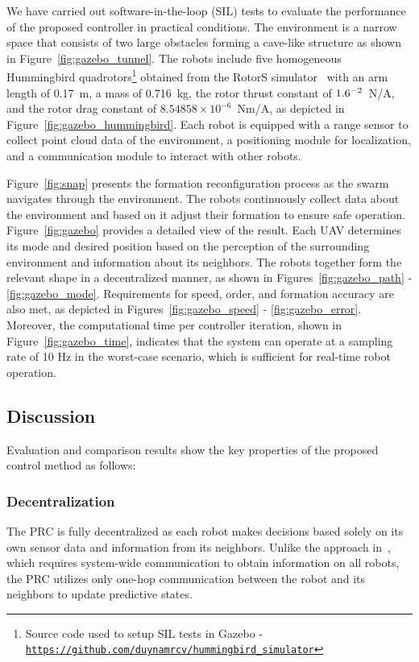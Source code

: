 We have carried out software-in-the-loop (SIL) tests to evaluate the performance of the proposed controller in practical conditions. The environment is a narrow space that consists of two large obstacles forming a cave-like structure as shown in Figure~\ref{fig:gazebo_tunnel}. The robots include five homogeneous Hummingbird quadrotors\footnote{Source code used to setup SIL tests in Gazebo - {\tt\url{https://github.com/duynamrcv/hummingbird_simulator}}} obtained from the RotorS simulator~\cite{Furrer2016} with an arm length of 0.17~m, a mass of 0.716~kg, the rotor thrust constant of $1.6\time10^{-2}$~N/A, and the rotor drag constant of $8.54858\times10^{-6}$~Nm/A, as depicted in Figure~\ref{fig:gazebo_hummingbird}. Each robot is equipped with a range sensor to collect point cloud data of the environment, a positioning module for localization, and a communication module to interact with other robots.

Figure~\ref{fig:snap} presents the formation reconfiguration process as the swarm navigates through the environment. The robots continuously collect data about the environment and based on it adjust their formation to ensure safe operation. Figure~\ref{fig:gazebo} provides a detailed view of the result. Each UAV determines its mode and desired position based on the perception of the surrounding environment and information about its neighbors. The robots together form the relevant shape in a decentralized manner, as shown in Figures~\ref{fig:gazebo_path} - \ref{fig:gazebo_mode}. Requirements for speed, order, and formation accuracy are also met, as depicted in Figures~\ref{fig:gazebo_speed} - \ref{fig:gazebo_error}. Moreover, the computational time per controller iteration, shown in Figure~\ref{fig:gazebo_time}, indicates that the system can operate at a sampling rate of 10 Hz in the worst-case scenario, which is sufficient for real-time robot operation.

\subsection{Discussion}
Evaluation and comparison results show the key properties of the proposed control method as follows:

\subsubsection{Decentralization} The PRC is fully decentralized as each robot makes decisions based solely on its own sensor data and information from its neighbors. Unlike the approach in~\cite{AlonsoMora2018}, which requires system-wide communication to obtain information on all robots, the PRC utilizes only one-hop communication between the robot and its neighbors to update predictive states.

